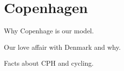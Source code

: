 \chapter{Copenhagen}

Why Copenhage is our model. 

Our love affair with Denmark and why.

Facts about CPH and cycling.
